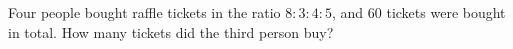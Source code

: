Four people bought raffle tickets in the ratio $8:3:4:5$, and $60$ tickets were bought in total. How many tickets did the third person buy?
